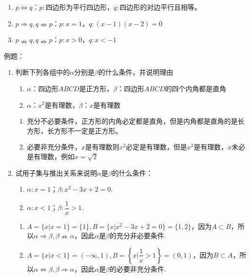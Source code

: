 \begin{example}
    \begin{enumerate}
        \item $p \Leftrightarrow q$：\quad $p:$四边形为平行四边形，$q:$四边形的对边平行且相等。
        \item $p \Rightarrow q, q \nRightarrow p$：\quad $p:x = 1$，\quad $q:(x-1)(x-2) = 0$
        \item $p \nRightarrow q, q \nRightarrow p$：\quad $p:x>0$，\quad $q:x < -1$
    \end{enumerate}
\end{example}

例题：
\begin{enumerate}
    \item 判断下列各组中的$\alpha$分别是$\beta$的什么条件，并说明理由
    \begin{enumerate}
        \item $\alpha$：四边形$ABCD$是正方形，$\beta$：四边形$ABCD$的四个内角都是直角
        \item $\alpha$：$x^2$是有理数，$\beta$：$x$是有理数
    \end{enumerate}
    \begin{jieda}
        \begin{enumerate}
            \item 充分不必要条件，正方形的内角必定都是直角，但是内角都是直角的是长方形，长方形不一定是正方形。
            \item 必要非充分条件，$x$是有理数则$x^2$必定是有理数，但是$x^2$是有理数，$x$未必是有理数，例如$x = \sqrt{2}$
        \end{enumerate}
    \end{jieda}
    \item 试用子集与推出关系来说明$\alpha$是$\beta$的什么条件：
    \begin{enumerate}
        \item $\alpha : x = 1$；$\beta: x^2-3x+2 = 0$.
        \item $\alpha : x < 1$；$\beta: \dfrac{1}{x} > 1$.
    \end{enumerate}
    \begin{jieda}
        \begin{enumerate}
            \item $A = \{x | x = 1\} = \{1\}, B = \{x | x^2-3x+2 = 0\} = \{1, 2\}$，因为$A \subset B$，所以$\alpha \Rightarrow \beta, \beta \nRightarrow \alpha$，因此$\alpha$是$\beta$的充分非必要条件.
            \item $A = \{x | x < 1\} = (-\infty, 1), B = \left\{x | \dfrac{1}{x} > 1 \right\} = (0, 1)$，因为$B \subset A$，所以$\alpha \nRightarrow \beta, \beta \Rightarrow \alpha$，因此$\alpha$是$\beta$的必要非充分条件.

\end{enumerate}
\end{jieda}
\end{enumerate}
